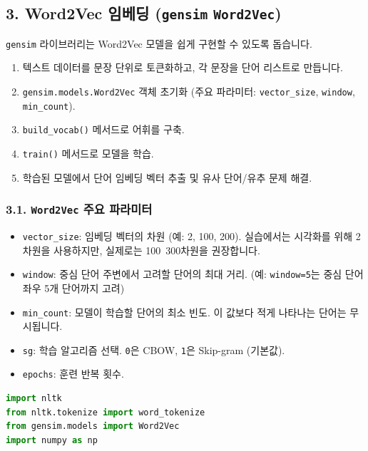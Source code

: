 \documentclass[11pt,a4paper]{article}
\begin{document}
\begin{tcolorbox}[examplebox, title=NLTK 스테밍 코드 예시]
\newpage
\subsection*{3. Word2Vec 임베딩 (\texttt{gensim} \texttt{Word2Vec})}
\texttt{gensim} 라이브러리는 Word2Vec 모델을 쉽게 구현할 수 있도록 돕습니다.

\begin{tcolorbox}[examplebox, title=Word2Vec 임베딩 기본 절차]
\begin{enumerate}
    \item 텍스트 데이터를 문장 단위로 토큰화하고, 각 문장을 단어 리스트로 만듭니다.
    \item \texttt{gensim.models.Word2Vec} 객체 초기화 (주요 파라미터: \texttt{vector\_size}, \texttt{window}, \texttt{min\_count}).
    \item \texttt{build\_vocab()} 메서드로 어휘를 구축.
    \item \texttt{train()} 메서드로 모델을 학습.
    \item 학습된 모델에서 단어 임베딩 벡터 추출 및 유사 단어/유추 문제 해결.
\end{enumerate}
\end{tcolorbox}

\subsubsection*{3.1. \texttt{Word2Vec} 주요 파라미터}
\begin{itemize}
    \item \texttt{vector\_size}: 임베딩 벡터의 차원 (예: 2, 100, 200). 실습에서는 시각화를 위해 2차원을 사용하지만, 실제로는 100~300차원을 권장합니다.
    \item \texttt{window}: 중심 단어 주변에서 고려할 단어의 최대 거리. (예: \texttt{window=5}는 중심 단어 좌우 5개 단어까지 고려)
    \item \texttt{min\_count}: 모델이 학습할 단어의 최소 빈도. 이 값보다 적게 나타나는 단어는 무시됩니다.
    \item \texttt{sg}: 학습 알고리즘 선택. \texttt{0}은 CBOW, \texttt{1}은 Skip-gram (기본값).
    \item \texttt{epochs}: 훈련 반복 횟수.
\end{itemize}

\begin{examplebox}[title=Word2Vec 임베딩 코드 예시]
\begin{lstlisting}[language=Python, caption=Word2Vec 모델 학습 및 임베딩 추출, label=lst:word2vec_basic]
import nltk
from nltk.tokenize import word_tokenize
from gensim.models import Word2Vec
import numpy as np


\end{lstlisting}
\end{examplebox}
\end{tcolorbox}
\end{document}
